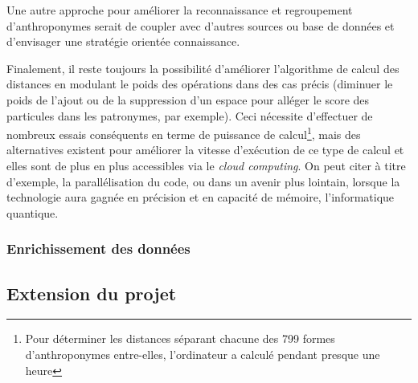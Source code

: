 Une autre approche pour améliorer la reconnaissance et regroupement d'anthroponymes serait de coupler avec d'autres sources ou base de données et d'envisager une stratégie orientée connaissance.


Finalement, il reste toujours la possibilité d'améliorer l'algorithme de calcul des distances en modulant le poids des opérations dans des cas précis (diminuer le poids de l'ajout ou de la suppression d'un espace pour alléger le score des particules dans les patronymes, par exemple). Ceci nécessite d'effectuer de nombreux essais conséquents en terme de puissance de calcul\footnote{Pour déterminer les distances séparant chacune des 799 formes d'anthroponymes entre-elles, l'ordinateur a calculé pendant presque une heure}, mais des alternatives existent pour améliorer la vitesse d'exécution de ce type de calcul et elles sont de plus en plus accessibles via le \textit{cloud computing}. On peut citer à titre d'exemple, la parallélisation du code, ou dans un avenir plus lointain, lorsque la technologie aura gagnée en précision et en capacité de mémoire, l'informatique quantique.

\subsubsection{Enrichissement des  données}
\subsection{Extension du projet}



